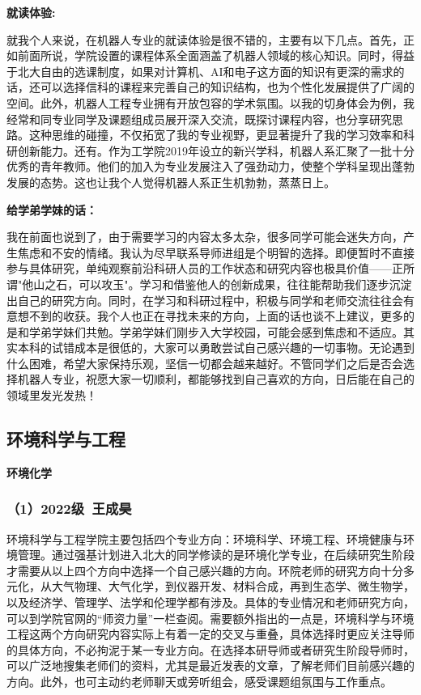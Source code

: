 \vspace{10pt}

\textbf{就读体验:}

就我个人来说，在机器人专业的就读体验是很不错的，主要有以下几点。首先，正如前面所说，学院设置的课程体系全面涵盖了机器人领域的核心知识。同时，得益于北大自由的选课制度，如果对计算机、AI和电子这方面的知识有更深的需求的话，还可以选择信科的课程来完善自己的知识结构，也为个性化发展提供了广阔的空间。此外，机器人工程专业拥有开放包容的学术氛围。以我的切身体会为例，我经常和同专业同学及课题组成员展开深入交流，既探讨课程内容，也分享研究思路。这种思维的碰撞，不仅拓宽了我的专业视野，更显著提升了我的学习效率和科研创新能力。还有。作为工学院2019年设立的新兴学科，机器人系汇聚了一批十分优秀的青年教师。他们的加入为专业发展注入了强劲动力，使整个学科呈现出蓬勃发展的态势。这也让我个人觉得机器人系正生机勃勃，蒸蒸日上。

\vspace{10pt}

\textbf{给学弟学妹的话：}

我在前面也说到了，由于需要学习的内容太多太杂，很多同学可能会迷失方向，产生焦虑和不安的情绪。我认为尽早联系导师进组是个明智的选择。即便暂时不直接参与具体研究，单纯观察前沿科研人员的工作状态和研究内容也极具价值——正所谓"他山之石，可以攻玉"。学习和借鉴他人的创新成果，往往能帮助我们逐步沉淀出自己的研究方向。同时，在学习和科研过程中，积极与同学和老师交流往往会有意想不到的收获。我个人也正在寻找未来的方向，上面的话也谈不上建议，更多的是和学弟学妹们共勉。学弟学妹们刚步入大学校园，可能会感到焦虑和不适应。其实本科的试错成本是很低的，大家可以勇敢尝试自己感兴趣的一切事物。无论遇到什么困难，希望大家保持乐观，坚信一切都会越来越好。不管同学们之后是否会选择机器人专业，祝愿大家一切顺利，都能够找到自己喜欢的方向，日后能在自己的领域里发光发热！

\subsection{环境科学与工程}

\vspace{10pt}

\textbf{环境化学}


\subsubsection{（1）2022级\ 王成昊}

环境科学与工程学院主要包括四个专业方向：环境科学、环境工程、环境健康与环境管理。通过强基计划进入北大的同学修读的是环境化学专业，在后续研究生阶段才需要从以上四个方向中选择一个自己感兴趣的方向。环院老师的研究方向十分多元化，从大气物理、大气化学，到仪器开发、材料合成，再到生态学、微生物学，以及经济学、管理学、法学和伦理学都有涉及。具体的专业情况和老师研究方向，可以到学院官网的“师资力量”一栏查阅。需要额外指出的一点是，环境科学与环境工程这两个方向研究内容实际上有着一定的交叉与重叠，具体选择时更应关注导师的具体方向，不必拘泥于某一专业方向。在选择本研导师或者研究生阶段导师时，可以广泛地搜集老师们的资料，尤其是最近发表的文章，了解老师们目前感兴趣的方向。此外，也可主动约老师聊天或旁听组会，感受课题组氛围与工作重点。

